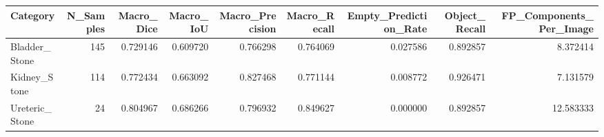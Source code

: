 \begin{tabular}{lrrrrrrrr}
\toprule
Category & N_Samples & Macro_Dice & Macro_IoU & Macro_Precision & Macro_Recall & Empty_Prediction_Rate & Object_Recall & FP_Components_Per_Image \\
\midrule
Bladder_Stone & 145 & 0.729146 & 0.609720 & 0.766298 & 0.764069 & 0.027586 & 0.892857 & 8.372414 \\
Kidney_Stone & 114 & 0.772434 & 0.663092 & 0.827468 & 0.771144 & 0.008772 & 0.926471 & 7.131579 \\
Ureteric_Stone & 24 & 0.804967 & 0.686266 & 0.796932 & 0.849627 & 0.000000 & 0.892857 & 12.583333 \\
\bottomrule
\end{tabular}
